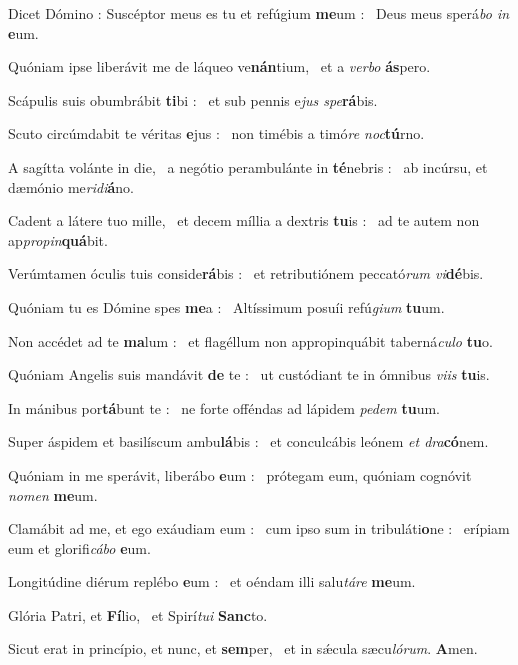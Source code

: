 \documentclass[12pt]{article} %
\newenvironment{psalmtext}{\leftskip 0.25in}{\vspace{1 mm}}
\let\oldgresixstar\gresixstar
\renewcommand{\gresixstar}{\textcolor{benred8}{\oldgresixstar}}
\let\oldgredagger\gredagger
\renewcommand{\gredagger}{\textcolor{benred8}{\oldgredagger}}
\begin{document}
\begin{psalmtext}
Dicet D\'{o}mino : Susc\'{e}ptor meus es tu et ref\'{u}gium \textbf{me}um : \gresixstar\ Deus meus sper\'{a}\emph{bo in} \textbf{e}um.

Qu\'{o}niam ipse liber\'{a}vit me de l\'{a}queo ve\textbf{n\'{a}n}tium, \gresixstar\ et a \emph{verbo} \textbf{\'{a}s}pero.

Sc\'{a}pulis suis obumbr\'{a}bit \textbf{ti}bi : \gresixstar\ et sub pennis e\emph{jus spe}\textbf{r\'{a}}bis.

Scuto circ\'{u}mdabit te v\'{e}ritas \textbf{e}jus : \gresixstar\ non tim\'{e}bis a tim\'{o}\emph{re noc}\textbf{t\'{u}}rno.

A sag\'{i}tta vol\'{a}nte in die, \gredagger\ a neg\'{o}tio perambul\'{a}nte in \textbf{t\'{e}}nebris : \gresixstar\ ab inc\'{u}rsu, et d\ae m\'{o}nio me\emph{ridi}\textbf{\'{a}}no.

Cadent a l\'{a}tere tuo mille, \gredagger\ et decem m\'{i}llia a dextris \textbf{tu}is : \gresixstar\ ad te autem non ap\emph{propin}\textbf{qu\'{a}}bit.

Ver\'{u}mtamen \'{o}culis tuis conside\textbf{r\'{a}}bis : \gresixstar\ et retributi\'{o}nem peccat\'{o}\emph{rum vi}\textbf{d\'{e}}bis.

Qu\'{o}niam tu es D\'{o}mine spes \textbf{me}a : \gresixstar\ Alt\'{i}ssimum posu\'{i}i ref\'{u}\emph{gium} \textbf{tu}um.

Non acc\'{e}det ad te \textbf{ma}lum : \gresixstar\ et flag\'{e}llum non appropinqu\'{a}bit tabern\'{a}\emph{culo} \textbf{tu}o.

Qu\'{o}niam Angelis suis mand\'{a}vit \textbf{de} te : \gresixstar\ ut cust\'{o}diant te in \'{o}mnibus \emph{viis} \textbf{tu}is.

In m\'{a}nibus por\textbf{t\'{a}}bunt te : \gresixstar\ ne forte off\'{e}ndas ad l\'{a}pidem \emph{pedem} \textbf{tu}um.

Super \'{a}spidem et basil\'{i}scum ambu\textbf{l\'{a}}bis : \gresixstar\ et conculc\'{a}bis le\'{o}nem \emph{et dra}\textbf{c\'{o}}nem.

Qu\'{o}niam in me sper\'{a}vit, liber\'{a}bo \textbf{e}um : \gresixstar\ pr\'{o}tegam eum, qu\'{o}niam cogn\'{o}vit \emph{nomen} \textbf{me}um.

Clam\'{a}bit ad me, et ego ex\'{a}udiam eum : \gredagger\ cum ipso sum in tribul\'{a}ti\textbf{o}ne : \gresixstar\ er\'{i}piam eum et glorifi\emph{c\'{a}bo} \textbf{e}um.

Longit\'{u}dine di\'{e}rum repl\'{e}bo \textbf{e}um : \gresixstar\ et o\'{e}ndam illi salu\emph{t\'{a}re} \textbf{me}um.

Gl\'{o}ria Patri, et \textbf{F\'{i}}lio, \gresixstar\ et Spir\'{i}\emph{tui} \textbf{Sanc}to.

Sicut erat in princ\'{i}pio, et nunc, et \textbf{sem}per, \gresixstar\ et in s\'{\ae}cula s\ae cu\emph{l\'{o}rum}. \textbf{A}men.

\end{psalmtext}
\end{document}
